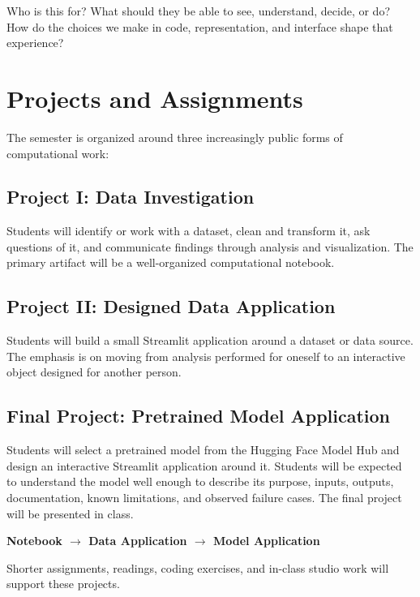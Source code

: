 \documentclass[11pt]{article}
\begin{document}
\begin{designprompt}
Who is this for? What should they be able to see, understand, decide, or do?
How do the choices we make in code, representation, and interface shape that
experience?
\end{designprompt}

\section{Projects and Assignments}

The semester is organized around three increasingly public forms of
computational work:

\subsection{Project I: Data Investigation}

Students will identify or work with a dataset, clean and transform it, ask
questions of it, and communicate findings through analysis and visualization.
The primary artifact will be a well-organized computational notebook.

\subsection{Project II: Designed Data Application}

Students will build a small Streamlit application around a dataset or data
source. The emphasis is on moving from analysis performed for oneself to an
interactive object designed for another person.

\subsection{Final Project: Pretrained Model Application}

Students will select a pretrained model from the Hugging Face Model Hub and
design an interactive Streamlit application around it. Students will be
expected to understand the model well enough to describe its purpose, inputs,
outputs, documentation, known limitations, and observed failure cases. The
final project will be presented in class.

\begin{center}
\large\bfseries
Notebook $\longrightarrow$ Data Application $\longrightarrow$ Model Application
\end{center}

Shorter assignments, readings, coding exercises, and in-class studio work will
support these projects.
\end{document}
